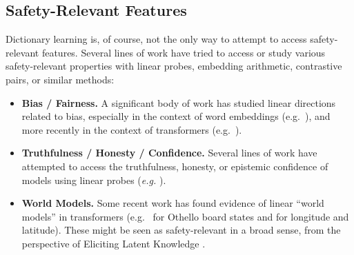 \documentclass{article}
\let\oldsection\section
\renewcommand{\section}{\FloatBarrier\oldsection}
\let\oldsubsection\subsection
\renewcommand{\subsection}{\FloatBarrier\oldsubsection}
\begin{document}
\subsection{Safety-Relevant Features}\label{sec:related-work-safety-features}

Dictionary learning is, of course, not the only way to attempt to access safety-relevant features. Several lines of work have tried to access or study various safety-relevant properties with linear probes, embedding arithmetic, contrastive pairs, or similar methods:

\begin{itemize}
    \item \textbf{Bias / Fairness.} A significant body of work has studied linear directions related to bias, especially in the context of word embeddings (e.g.~\cite{bolukbasi2016man}), and more recently in the context of transformers (e.g.~\cite{dev2020measuring}).
    \item \textbf{Truthfulness / Honesty / Confidence.} Several lines of work have attempted to access the truthfulness, honesty, or epistemic confidence of models using linear probes (\textit{e.g.} \cite{burns2022discovering,kadavath2022language,marks2023geometry,mallen2023eliciting,macdiarmid2024sleeperagentprobes}).
    \item \textbf{World Models.} Some recent work has found evidence of linear “world models” in transformers (e.g.~\cite{nanda2023actually} for Othello board states and \cite{gurnee2024language} for longitude and latitude). These might be seen as safety-relevant in a broad sense, from the perspective of Eliciting Latent Knowledge \cite{christiano2021eliciting}.
\end{itemize}




\newpage
\appendix



\end{document}
